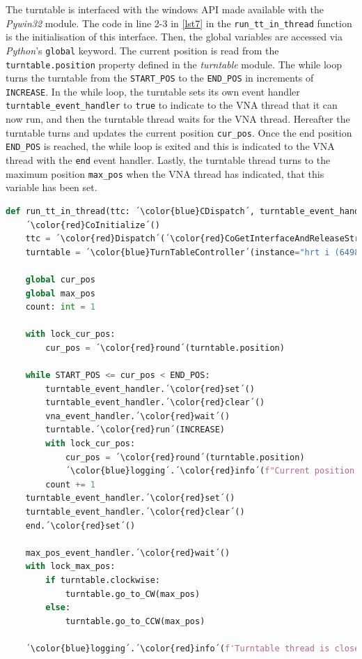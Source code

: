 The turntable is interfaced with the windows API made available with the \textit{Pywin32} module. The code in line 2-3 in \ref{lst7} in the \verb+run_tt_in_thread+ function is the initialisation of this interface. Then, the global variables are accessed via \textit{Python}'s \verb+global+ keyword. The current position is read from the \verb+turntable.position+ property defined in the \textit{turntable} module. The while loop turns the turntable from the \verb+START_POS+ to the \verb+END_POS+ in increments of \verb+INCREASE+. In the while loop, the turntable sets its own event handler \verb+turntable_event_handler+ to \verb+true+ to indicate to the VNA thread that it can now run, and then the turntable thread waits for the VNA thread. Hereafter the turntable turns and updates the current position \verb+cur_pos+. Once the end position \verb+END_POS+ is reached, the while loop is exited and this is indicated to the VNA thread with the \verb+end+ event handler. Lastly, the turntable thread turns to the maximum position \verb+max_pos+ when the VNA thread has indicated, that this variable has been set. 

\begin{lstlisting}[language=Python, caption=Thread function for running VNA.]
def run_tt_in_thread(ttc: ´\color{blue}CDispatch´, turntable_event_handler: ´\color{blue}Event´, vna_event_handler: ´\color{blue}Event´, end: ´\color{blue}Event´, ttc_id) -> None:
    ´\color{red}CoInitialize´()
    ttc = ´\color{red}Dispatch´(´\color{red}CoGetInterfaceAndReleaseStream´(ttc_id, IID_IDispatch))
    turntable = ´\color{blue}TurnTableController´(instance="hrt i (64980128)", ttc=ttc, clockwise=True, start_pos=START_POS)
    
    global cur_pos
    global max_pos
    count: int = 1

    with lock_cur_pos:
        cur_pos = ´\color{red}round´(turntable.position)

    while START_POS <= cur_pos < END_POS:
        turntable_event_handler.´\color{red}set´()
        turntable_event_handler.´\color{red}clear´()
        vna_event_handler.´\color{red}wait´()
        turntable.´\color{red}run´(INCREASE)
        with lock_cur_pos:
            cur_pos = ´\color{red}round´(turntable.position) 
            ´\color{blue}logging´.´\color{red}info´(f"Current position for {turntable.instance} is {cur_pos}.")
        count += 1
    turntable_event_handler.´\color{red}set´()
    turntable_event_handler.´\color{red}clear´()
    end.´\color{red}set´()

    max_pos_event_handler.´\color{red}wait´()
    with lock_max_pos:
        if turntable.clockwise:
            turntable.go_to_CW(max_pos)
        else:
            turntable.go_to_CCW(max_pos)

    ´\color{blue}logging´.´\color{red}info´(f'Turntable thread is closed. {count} positions measured.')
\end{lstlisting} \label{lst7}


